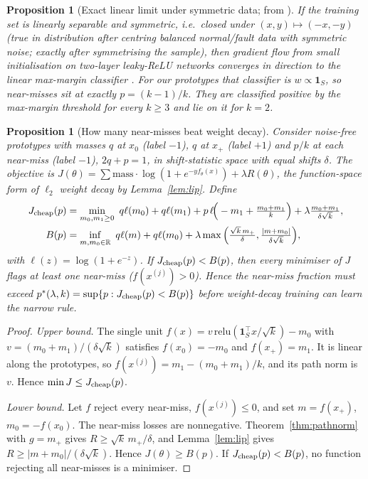 \documentclass[11pt]{article}
\newtheorem{proposition}[theorem]{Proposition}
\theoremstyle{definition}
\theoremstyle{remark}
\newcommand{\R}{\mathbb{R}}
\newcommand{\1}{\mathbf{1}}
\newcommand{\relu}{\mathrm{relu}}
\begin{document}
\begin{proposition}[Exact linear limit under symmetric data; from \citet{lyu2021}]\label{prop:lyu}
If the training set is linearly separable and symmetric, i.e.\ closed under $(x,y)\mapsto(-x,-y)$ (true in distribution after centring balanced normal/fault data with symmetric noise; exactly after symmetrising the sample), then gradient flow from small initialisation on two-layer leaky-ReLU networks converges in direction to the linear max-margin classifier \citep[main theorem]{lyu2021}. For our prototypes that classifier is $w\propto\1_S$, so near-misses sit at exactly $p=(k-1)/k$. They are classified positive by the max-margin threshold for every $k\ge3$ and lie on it for $k=2$.
\end{proposition}

\begin{proposition}[How many near-misses beat weight decay]\label{prop:pstar}
Consider noise-free prototypes with masses $q$ at $x_0$ (label $-1$), $q$ at $x_+$ (label $+1$) and $p/k$ at each near-miss (label $-1$), $2q+p=1$, in shift-statistic space with equal shifts $\delta$. The objective is $J(\theta)=\sum\text{mass}\cdot\log(1+e^{-yf_\theta(x)})+\lambda R(\theta)$, the function-space form of $\ell_2$ weight decay by Lemma~\ref{lem:lip}. Define
\begin{align*}
J_{\rm cheap}(p)&=\min_{m_0,m_1\ge0}\ q\ell(m_0)+q\ell(m_1)+p\,\ell\!\Big(-m_1+\tfrac{m_0+m_1}{k}\Big)+\lambda\tfrac{m_0+m_1}{\delta\sqrt k},\\
B(p)&=\inf_{m,m_0\in\R}\ q\ell(m)+q\ell(m_0)+\lambda\max\Big(\tfrac{\sqrt k\,m_+}{\delta},\tfrac{|m+m_0|}{\delta\sqrt k}\Big),
\end{align*}
with $\ell(z)=\log(1+e^{-z})$. If $J_{\rm cheap}(p)<B(p)$, then every minimiser of $J$ flags at least one near-miss ($f(x^{(j)})>0$). Hence the near-miss fraction must exceed $p^*(\lambda,k)=\sup\{p:J_{\rm cheap}(p)<B(p)\}$ before weight-decay training can learn the narrow rule.
\end{proposition}
\begin{proof}
\emph{Upper bound.} The single unit $f(x)=v\,\relu(\1_S^\top x/\sqrt k)-m_0$ with $v=(m_0+m_1)/(\delta\sqrt k)$ satisfies $f(x_0)=-m_0$ and $f(x_+)=m_1$. It is linear along the prototypes, so $f(x^{(j)})=m_1-(m_0+m_1)/k$, and its path norm is $v$. Hence $\min J\le J_{\rm cheap}(p)$.

\emph{Lower bound.} Let $f$ reject every near-miss, $f(x^{(j)})\le0$, and set $m=f(x_+)$, $m_0=-f(x_0)$. The near-miss losses are nonnegative. Theorem~\ref{thm:pathnorm} with $g=m_+$ gives $R\ge\sqrt k\,m_+/\delta$, and Lemma~\ref{lem:lip} gives $R\ge|m+m_0|/(\delta\sqrt k)$. Hence $J(\theta)\ge B(p)$. If $J_{\rm cheap}(p)<B(p)$, no function rejecting all near-misses is a minimiser.
\end{proof}
\end{document}
